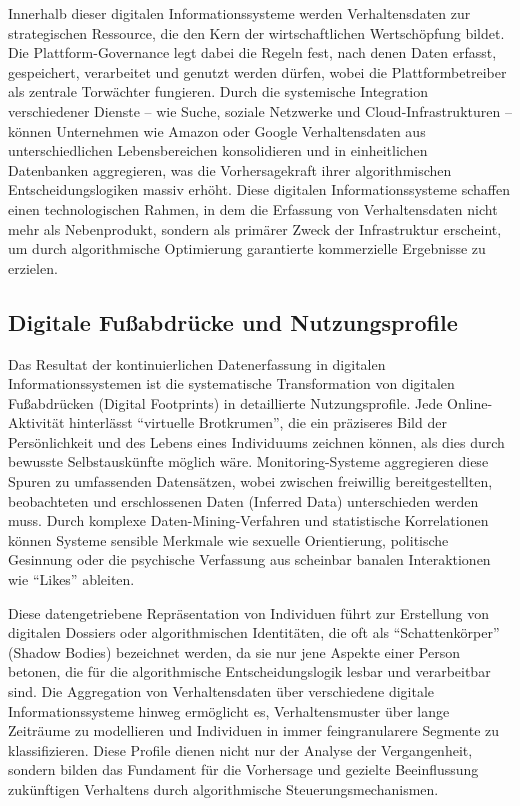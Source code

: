 Innerhalb dieser digitalen Informationssysteme werden Verhaltensdaten zur strategischen Ressource, die den Kern der wirtschaftlichen Wertschöpfung bildet. Die Plattform-Governance legt dabei die Regeln fest, nach denen Daten erfasst, gespeichert, verarbeitet und genutzt werden dürfen, wobei die Plattformbetreiber als zentrale Torwächter fungieren. Durch die systemische Integration verschiedener Dienste -- wie Suche, soziale Netzwerke und Cloud-Infrastrukturen -- können Unternehmen wie Amazon oder Google Verhaltensdaten aus unterschiedlichen Lebensbereichen konsolidieren und in einheitlichen Datenbanken aggregieren, was die Vorhersagekraft ihrer algorithmischen Entscheidungslogiken massiv erhöht. Diese digitalen Informationssysteme schaffen einen technologischen Rahmen, in dem die Erfassung von Verhaltensdaten nicht mehr als Nebenprodukt, sondern als primärer Zweck der Infrastruktur erscheint, um durch algorithmische Optimierung garantierte kommerzielle Ergebnisse zu erzielen.

\subsection{Digitale Fußabdrücke und Nutzungsprofile}

Das Resultat der kontinuierlichen Datenerfassung in digitalen Informationssystemen ist die systematische Transformation von digitalen Fußabdrücken (Digital Footprints) in detaillierte Nutzungsprofile. Jede Online-Aktivität hinterlässt \enquote{virtuelle Brotkrumen}, die ein präziseres Bild der Persönlichkeit und des Lebens eines Individuums zeichnen können, als dies durch bewusste Selbstauskünfte möglich wäre. Monitoring-Systeme aggregieren diese Spuren zu umfassenden Datensätzen, wobei zwischen freiwillig bereitgestellten, beobachteten und erschlossenen Daten (Inferred Data) unterschieden werden muss. Durch komplexe Daten-Mining-Verfahren und statistische Korrelationen können Systeme sensible Merkmale wie sexuelle Orientierung, politische Gesinnung oder die psychische Verfassung aus scheinbar banalen Interaktionen wie \enquote{Likes} ableiten.

Diese datengetriebene Repräsentation von Individuen führt zur Erstellung von digitalen Dossiers oder algorithmischen Identitäten, die oft als \enquote{Schattenkörper} (Shadow Bodies) bezeichnet werden, da sie nur jene Aspekte einer Person betonen, die für die algorithmische Entscheidungslogik lesbar und verarbeitbar sind. Die Aggregation von Verhaltensdaten über verschiedene digitale Informationssysteme hinweg ermöglicht es, Verhaltensmuster über lange Zeiträume zu modellieren und Individuen in immer feingranularere Segmente zu klassifizieren. Diese Profile dienen nicht nur der Analyse der Vergangenheit, sondern bilden das Fundament für die Vorhersage und gezielte Beeinflussung zukünftigen Verhaltens durch algorithmische Steuerungsmechanismen.


